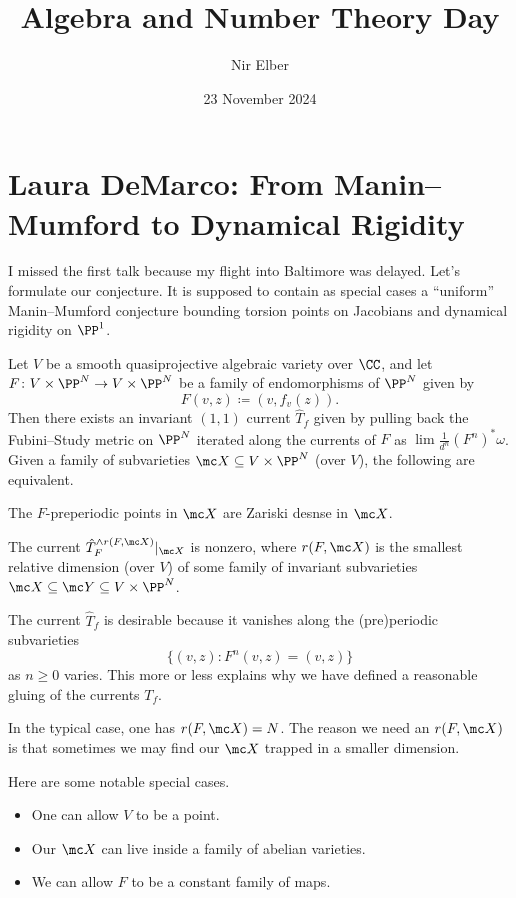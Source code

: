 \documentclass{article}
\title{Algebra and Number Theory Day}
\author{Nir Elber}
\date{23 November 2024}
\begin{document}
\maketitle

\tableofcontents

\section{Laura DeMarco: From Manin--Mumford to Dynamical Rigidity}
I missed the first talk because my flight into Baltimore was delayed. Let's formulate our conjecture. It is supposed to contain as special cases a ``uniform'' Manin--Mumford conjecture bounding torsion points on Jacobians and dynamical rigidity on $\PP^1$.
\begin{conj}
	Let $V$ be a smooth quasiprojective algebraic variety over $\CC$, and let $F\colon V\times\PP^N\to V\times\PP^N$ be a family of endomorphisms of $\PP^N$ given by
	\[F(v,z)\coloneqq(v,f_v(z)).\]
	Then there exists an invariant $(1,1)$ current $\hat T_f$ given by pulling back the Fubini--Study metric on $\PP^N$ iterated along the currents of $F$ as $\lim\frac1{d^n}(F^n)^*\omega$. Given a family of subvarieties $\mc X\subseteq V\times\PP^N$ (over $V$), the following are equivalent.
	\begin{listalph}
		\item The $F$-preperiodic points in $\mc X$ are Zariski desnse in $\mc X$.
		\item The current $\hat T_F^{\land r(F,\mc X)}|_{\mc X}$ is nonzero, where $r(F,\mc X)$ is the smallest relative dimension (over $V$) of some family of invariant subvarieties $\mc X\subseteq\mc Y\subseteq V\times\PP^N$.
	\end{listalph}
\end{conj}
\begin{remark}
	The current $\hat T_f$ is desirable because it vanishes along the (pre)periodic subvarieties
	\[\{(v,z):F^n(v,z)=(v,z)\}\]
	as $n\ge0$ varies. This more or less explains why we have defined a reasonable gluing of the currents $T_f$.
\end{remark}
\begin{remark}
	In the typical case, one has $r(F,\mc X)=N$. The reason we need an $r(F,\mc X)$ is that sometimes we may find our $\mc X$ trapped in a smaller dimension.
\end{remark}
\begin{remark}
	Here are some notable special cases.
	\begin{itemize}
		\item One can allow $V$ to be a point.
		\item Our $\mc X$ can live inside a family of abelian varieties.
		\item We can allow $F$ to be a constant family of maps.
	\end{itemize}
\end{remark}
\end{document}
